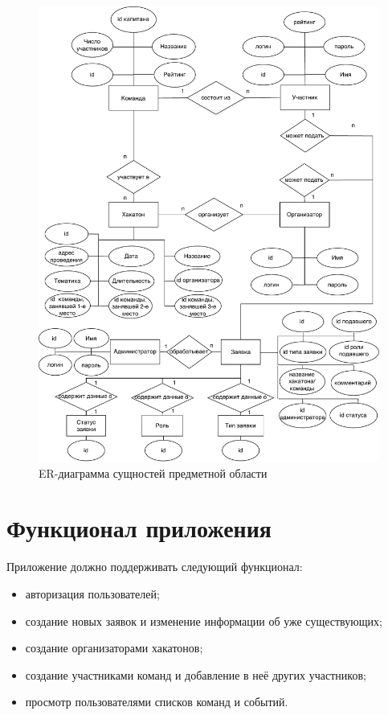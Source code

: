 \begin{figure}[H]
	\begin{center}
		\includegraphics[page=1,scale=0.8]{assets/ER-Chen.drawio.pdf}
	\end{center}
	\caption{ER-диаграмма сущностей предметной области}
	\label{er-diagram}
\end{figure}

\section{Функционал приложения}

Приложение должно поддерживать следующий функционал:
\begin{itemize}
	\item авторизация пользователей;
	\item создание новых заявок и изменение информации об уже существующих;
	\item создание организаторами хакатонов;
	\item создание участниками команд и добавление в неё других участников;
	\item просмотр пользователями списков команд и событий.
\end{itemize}

